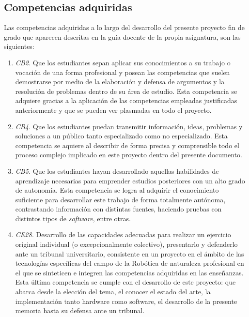 \subsection{Competencias adquiridas}

Las competencias adquiridas a lo largo del desarrollo del presente proyecto fin de grado que aparecen descritas en la guía docente de la propia asignatura, son las siguientes: 

\begin{enumerate}
	\item{\textit{CB2.} Que los estudiantes sepan aplicar sus conocimientos a su trabajo o vocación de una forma profesional y posean las competencias que suelen demostrarse por medio de la elaboración y defensa de argumentos y la resolución de problemas dentro de su área de estudio. 
	Esta competencia se adquiere gracias a la aplicación de las competencias empleadas justificadas anteriormente y que se pueden ver plasmadas en todo el proyecto.}
	\item{\textit{CB4.} Que los estudiantes puedan transmitir información, ideas, problemas y soluciones a un público tanto especializado como no especializado. 
	Esta competencia se aquiere al describir de forma precisa y comprensible todo el proceso complejo implicado en este proyecto dentro del presente documento.}
	\item{\textit{CB5.} Que los estudiantes hayan desarrollado aquellas habilidades de aprendizaje necesarias para emprender estudios posteriores con un alto grado de autonomía. 
	Esta competencia se logra al adquirir el conocimiento suficiente para desarrollar este trabajo de forma totalmente autónoma, contrastando información con distintas fuentes, haciendo pruebas con distintos tipos de \textit{software}, entre otras.}
	\item{\textit{CE28.} Desarrollo de las capacidades adecuadas para realizar un ejercicio original individual (o excepcionalmente colectivo), presentarlo y defenderlo ante un tribunal universitario, consistente en un proyecto en el ámbito de las tecnologías específicas del campo de la Robótica de naturaleza profesional en el que se sinteticen e integren las competencias adquiridas en las enseñanzas.
	Esta última competencia se cumple con el desarrollo de este proyecto: que abarca desde la elección del tema, el conocer el estado del arte, la implementación tanto hardware como software, el desarrollo de la presente memoria hasta su defensa ante un tribunal.}
\end{enumerate}



